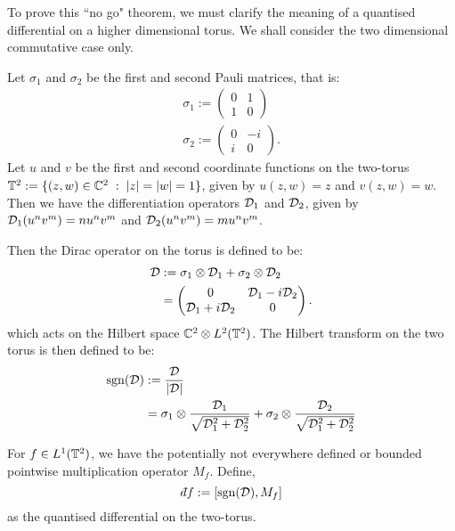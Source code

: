 To prove this ``no go" theorem, we must clarify the meaning of a quantised differential
on a higher dimensional torus. We shall consider the two dimensional commutative case only.
\begin{definition}
\label{twoDirac}
    Let $\sigma_1$ and $\sigma_2$ be the first and second
    Pauli matrices, that is:
    \begin{align*}
        \sigma_1 := \begin{pmatrix}
            0 & 1\\
            1 & 0
        \end{pmatrix}\\
        \sigma_2 := \begin{pmatrix}
            0 & -i\\
            i & 0
        \end{pmatrix}.
    \end{align*}
    Let $u$ and $v$ be the first and second coordinate
    functions on the two-torus $\mathbb{T}^2 := \{(z,w) \in \mathbb{C}^2\;:\;|z| = |w| = 1\}$,
    given by $u(z,w) = z$ and $v(z,w) = w$. Then we have the differentiation
    operators $\mathcal{D}_1$ and $\mathcal{D}_2$, given by $\mathcal{D}_1(u^nv^m) = nu^nv^m$
    and $\mathcal{D}_2(u^nv^m) = mu^nv^m$.
    
    Then the Dirac operator on the torus is defined to be:
    \begin{align*}
        \mathcal{D} &:= \sigma_1 \otimes \mathcal{D}_1 + \sigma_2 \otimes \mathcal{D}_2\\
        &= \begin{pmatrix}
            0 & \mathcal{D}_1-i\mathcal{D}_2\\
            \mathcal{D}_1 + i\mathcal{D}_2 & 0
        \end{pmatrix}.
    \end{align*}
    which acts on the Hilbert space $\mathbb{C}^2 \otimes L^2(\mathbb{T}^2)$.
    The Hilbert transform on the two torus is then defined to be:
    \begin{align*}
        \operatorname{sgn}(\mathcal{D}) &:= \frac{\mathcal{D}}{|\mathcal{D}|}\\
        &= \sigma_1 \otimes \frac{\mathcal{D}_1}{\sqrt{\mathcal{D}_1^2+\mathcal{D}_2^2}} + \sigma_2 \otimes \frac{\mathcal{D}_2}{\sqrt{\mathcal{D}_1^2+\mathcal{D}_2^2}}
    \end{align*}
    
    For $f \in L^1(\mathbb{T}^2)$, we have the potentially not everywhere defined
    or bounded pointwise multiplication operator $M_f$. Define,
    \begin{equation}
        \qd f := [\sgn(\D),M_f]
    \end{equation}    
    as the quantised differential on the two-torus.
\end{definition}
